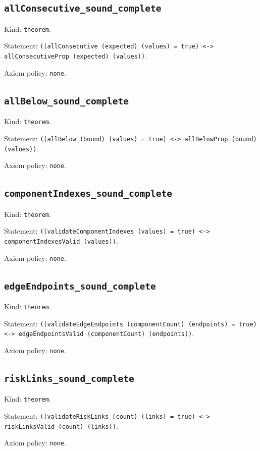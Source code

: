 \documentclass[11pt]{article}
\begin{document}
\subsection*{\texttt{allConsecutive\_sound\_complete}}
\noindent Kind: \texttt{theorem}.\par
\noindent Statement: \texttt{((allConsecutive (expected) (values) = true) <-> allConsecutiveProp (expected) (values))}.\par
\noindent Axiom policy: \texttt{none}.\par
\subsection*{\texttt{allBelow\_sound\_complete}}
\noindent Kind: \texttt{theorem}.\par
\noindent Statement: \texttt{((allBelow (bound) (values) = true) <-> allBelowProp (bound) (values))}.\par
\noindent Axiom policy: \texttt{none}.\par
\subsection*{\texttt{componentIndexes\_sound\_complete}}
\noindent Kind: \texttt{theorem}.\par
\noindent Statement: \texttt{((validateComponentIndexes (values) = true) <-> componentIndexesValid (values))}.\par
\noindent Axiom policy: \texttt{none}.\par
\subsection*{\texttt{edgeEndpoints\_sound\_complete}}
\noindent Kind: \texttt{theorem}.\par
\noindent Statement: \texttt{((validateEdgeEndpoints (componentCount) (endpoints) = true) <-> edgeEndpointsValid (componentCount) (endpoints))}.\par
\noindent Axiom policy: \texttt{none}.\par
\subsection*{\texttt{riskLinks\_sound\_complete}}
\noindent Kind: \texttt{theorem}.\par
\noindent Statement: \texttt{((validateRiskLinks (count) (links) = true) <-> riskLinksValid (count) (links))}.\par
\noindent Axiom policy: \texttt{none}.\par
\end{document}
